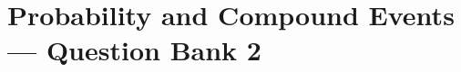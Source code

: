 \documentclass[12pt, fleqn, openany, oneside]{studyGuide}
\begin{document}

\chapter{Probability and Compound Events — Question Bank 2}













\printAnswerKey
\end{document}
